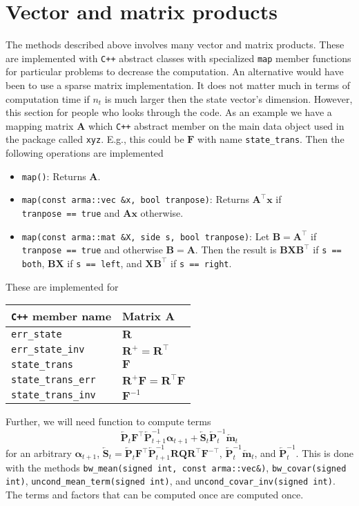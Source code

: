 \documentclass[notitlepage]{article}
\renewcommand{\vec}[1]{\bm{#1}}
\newcommand{\vecLarrow}[1]{\overleftarrow{\vec{#1}}}
\newcommand{\mat}[1]{\mathbf{#1}}
\newcommand{\matLarrow}[1]{\overleftarrow{\mat{#1}}}
\begin{document}
\section{Vector and matrix products}
The methods described above involves many vector and matrix products. These are implemented with \texttt{C++} 
abstract classes with specialized \texttt{map} member functions for particular problems to 
decrease the computation. An alternative would have been to use a sparse matrix implementation.
It does not matter much in terms of computation time if $n_t$ is much larger then 
the state vector's dimension. However, this section for people who looks through 
the code.  
As an example we have a mapping matrix $\mat{A}$ which \texttt{C++} abstract member on the main 
data object used in the package called \texttt{xyz}. E.g., this could be $\mat{F}$ with name 
\texttt{state\_trans}. Then the following operations are implemented %
%
\begin{itemize}
\item \texttt{map()}: Returns $\mat{A}$.
%
\item \texttt{map(const arma::vec \&x, bool tranpose)}: Returns $\mat{A}^\top\vec{x}$ if \\ \texttt{tranpose == true} and $\mat{A}\vec{x}$ otherwise.
%
\item \texttt{map(const arma::mat \&X, side s, bool tranpose)}: Let $\mat{B}=\mat{A}^\top$ if  \texttt{tranpose == true} and otherwise $\mat{B}=\mat{A}$. Then the result is  $\mat{B}\mat{X}\mat{B}^\top$ if \texttt{s == both}, $\mat{B}\mat{X}$ if \texttt{s == left}, and $\mat{X}\mat{B}^\top$ if \texttt{s == right}.
\end{itemize}%
%
These are implemented for %
%
\begin{center}
\begin{tabular}{ l l } 
 \texttt{C++} member name & Matrix $\mat{A}$ \\
 \hline
 \texttt{err\_state}               & $\mat{R}$ \\
 \texttt{err\_state\_inv}           & $\mat{R}^{+} = \mat{R}^\top$ \\
 \texttt{state\_trans}             & $\mat{F}$ \\
 \texttt{state\_trans\_err}         & $\mat{R}^{+}\mat{F} = \mat{R}^\top\mat{F}$ \\
 \texttt{state\_trans\_inv}         & $\mat{F}^{-1}$
\end{tabular}
\end{center}%
%
Further, we will need function to compute terms %
%
$$
	\matLarrow{P}_t\mat{F}^\top\matLarrow{P}_{t + 1}^{-1}\vec{\alpha}_{t+1}
		+ \matLarrow{S}_t\matLarrow{P}_t^{-1} \vecLarrow{m}_t
$$%
%
for an arbitrary $\vec{\alpha}_{t+1}$, %
$\matLarrow{S}_t = \matLarrow{P}_t\mat{F}^\top\matLarrow{P}_{t + 1}^{-1}\mat{R}\mat{Q}\mat{R}^\top\mat{F}^{-\top}$, %
$\matLarrow{P}_t^{-1}\vecLarrow{m}_t$, and $\matLarrow{P}_t^{-1}$. This is done with the methods 
\texttt{bw\_mean(signed int, const arma::vec\&)}, %
\texttt{bw\_covar(signed int)}, %
\texttt{uncond\_mean\_term(\allowbreak signed int)}, and 
\texttt{uncond\_covar\_inv(\allowbreak  signed int)}. 
The terms and factors that can be computed once are 
computed once.
\end{document}
